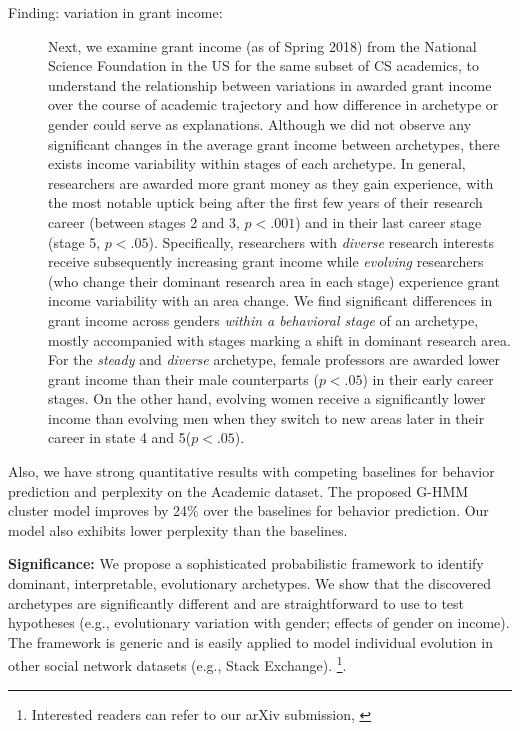\documentclass[10pt,letterpaper]{article}
\begin{document}
\begin{description}
\item[ Finding: variation in grant income:]  Next, we examine grant income (as of Spring 2018) from the National Science Foundation in the US for the same subset of CS academics, to understand the relationship between variations in awarded grant income over the course of academic trajectory and how difference in archetype or gender could serve as explanations.
Although we did not observe any significant changes in the average grant income between archetypes, there exists income variability within stages of each archetype.
In general, researchers are awarded more grant money as they gain experience, with the most notable uptick being after the first few years of their research career (between stages 2 and 3, $p< .001$) and in their last career stage (stage 5, $p< .05$).
Specifically, researchers with \emph{diverse} research interests receive subsequently increasing grant income while \emph{evolving} researchers (who change their dominant research area in each stage) experience grant income variability with an area change.
We find significant differences in grant income across genders \textit{within a behavioral stage} of an archetype, mostly accompanied with stages marking a shift in dominant research area. For the \textit{steady} and \textit{diverse} archetype, female professors are awarded lower grant income than their male counterparts ($p< .05$) in their early career stages. On the other hand, evolving women receive a significantly lower income than evolving men when they switch to new areas later in their career in state 4 and 5($p < .05$).
\end{description}

Also, we have strong quantitative results with competing baselines for behavior prediction and perplexity on the Academic dataset. The proposed G-HMM cluster model improves by 24\% over the baselines for behavior prediction. Our model also exhibits lower perplexity than the baselines.

\textbf{Significance:} We propose a sophisticated probabilistic framework to identify dominant, interpretable, evolutionary archetypes. We show that the discovered archetypes are significantly different and are straightforward to use to test hypotheses (e.g., evolutionary variation with gender; effects of gender on income). The framework is generic and is easily applied to model individual evolution in other social network datasets (e.g., Stack Exchange). \footnote{Interested readers can refer to our arXiv submission, \cite{Anonymous2019}}.
\end{document}
